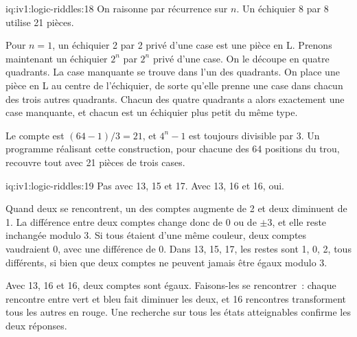 \begin{solution}{iq:iv1:logic-riddles:18}
On raisonne par récurrence sur $n$. Un échiquier 8 par 8 utilise 21 pièces.

Pour $n = 1$, un échiquier 2 par 2 privé d'une case est une pièce en L. Prenons maintenant un échiquier $2^n$ par $2^n$ privé d'une case. On le découpe en quatre quadrants. La case manquante se trouve dans l'un des quadrants. On place une pièce en L au centre de l'échiquier, de sorte qu'elle prenne une case dans chacun des trois autres quadrants. Chacun des quatre quadrants a alors exactement une case manquante, et chacun est un échiquier plus petit du même type.

Le compte est $(64 - 1)/3 = 21$, et $4^n - 1$ est toujours divisible par 3. Un programme réalisant cette construction, pour chacune des 64 positions du trou, recouvre tout avec 21 pièces de trois cases.

\end{solution}

\begin{solution}{iq:iv1:logic-riddles:19}
Pas avec 13, 15 et 17. Avec 13, 16 et 16, oui.

Quand deux se rencontrent, un des comptes augmente de 2 et deux diminuent de 1. La différence entre deux comptes change donc de 0 ou de $\pm 3$, et elle reste inchangée modulo 3. Si tous étaient d'une même couleur, deux comptes vaudraient 0, avec une différence de 0. Dans 13, 15, 17, les restes sont 1, 0, 2, tous différents, si bien que deux comptes ne peuvent jamais être égaux modulo 3.

Avec 13, 16 et 16, deux comptes sont égaux. Faisons-les se rencontrer~: chaque rencontre entre vert et bleu fait diminuer les deux, et 16 rencontres transforment tous les autres en rouge. Une recherche sur tous les états atteignables confirme les deux réponses.

\end{solution}

